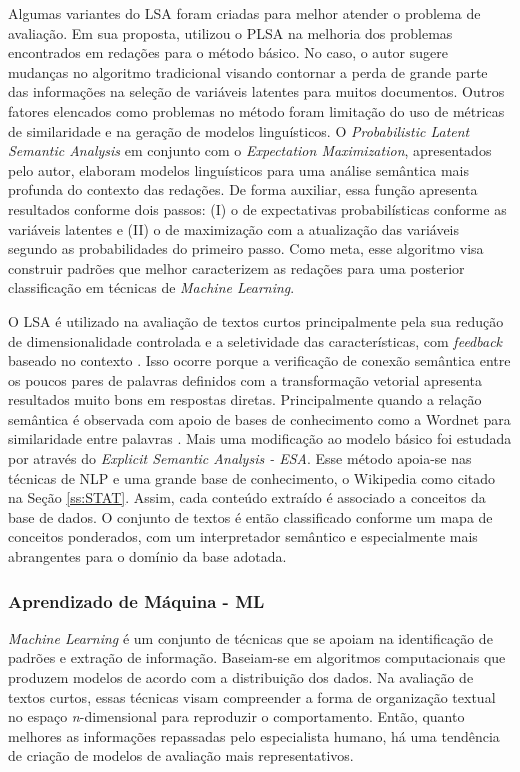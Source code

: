 Algumas variantes do LSA foram criadas para melhor atender o problema de avaliação. Em sua proposta,  utilizou o PLSA na melhoria dos problemas encontrados em redações para o método básico. No caso, o autor sugere mudanças no algoritmo tradicional visando contornar a perda de grande parte das informações na seleção de variáveis latentes para muitos documentos. Outros fatores elencados como problemas no método foram limitação do uso de métricas de similaridade e na geração de modelos linguísticos. O \textit{Probabilistic Latent Semantic Analysis} em conjunto com o \textit{Expectation Maximization}, apresentados pelo autor, elaboram modelos linguísticos para uma análise semântica mais profunda do contexto das redações. De forma auxiliar, essa função apresenta resultados conforme dois passos: (I) o de expectativas probabilísticas conforme as variáveis latentes e (II) o de maximização com a atualização das variáveis segundo as probabilidades do primeiro passo. Como meta, esse algoritmo visa construir padrões que melhor caracterizem as redações para uma posterior classificação em técnicas de \textit{Machine Learning}.

O LSA é utilizado na avaliação de textos curtos principalmente pela sua redução de dimensionalidade controlada e a seletividade das características, com \textit{feedback} baseado no contexto \cite{perez2005}. Isso ocorre porque a verificação de conexão semântica entre os poucos pares de palavras definidos com a transformação vetorial apresenta resultados muito bons em respostas diretas. Principalmente quando a relação semântica é observada com apoio de bases de conhecimento como a Wordnet para similaridade entre palavras \cite{mohler2009}. Mais uma modificação ao modelo básico foi estudada por  através do \textit{Explicit Semantic Analysis - ESA}. Esse método apoia-se nas técnicas de NLP e uma grande base de conhecimento, o Wikipedia como citado na Seção \ref{ss:STAT}. Assim, cada conteúdo extraído é associado a conceitos da base de dados. O conjunto de textos é então classificado conforme um mapa de conceitos ponderados, com um interpretador semântico e especialmente mais abrangentes para o domínio da base adotada.

\subsubsection{Aprendizado de Máquina - ML}\label{ss:ML}
\textit{Machine Learning} é um conjunto de técnicas que se apoiam na identificação de padrões e extração de informação. Baseiam-se em algoritmos computacionais que produzem modelos de acordo com a distribuição dos dados. Na avaliação de textos curtos, essas técnicas visam compreender a forma de organização textual no espaço \textit{n}-dimensional para reproduzir o comportamento. Então, quanto melhores as informações repassadas pelo especialista humano, há uma tendência de criação de modelos de avaliação mais representativos.

